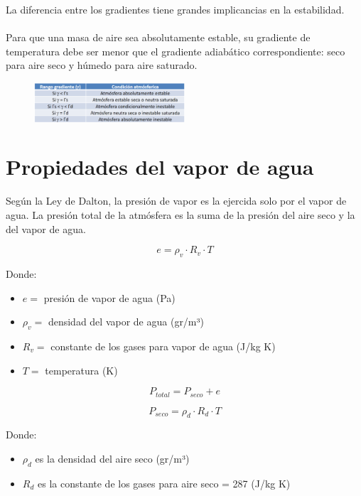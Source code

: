 La diferencia entre los gradientes tiene grandes implicancias en la estabilidad.
\\\\
Para que una masa de aire sea absolutamente estable, su gradiente de temperatura debe ser menor que el gradiente adiabático correspondiente: seco para aire seco y húmedo para aire saturado.

\begin{figure}[H]
    \centering
    \includegraphics[width=0.5\textwidth]{imagenes/estabilidad.png}
    \label{fig:estabilidad}
\end{figure}

\section{Propiedades del vapor de agua}

Según la Ley de Dalton, la presión de vapor es la ejercida solo por el vapor de agua. La presión total de la atmósfera es la suma de la presión del aire seco y la del vapor de agua.

\begin{equation}
    e = \rho_v \cdot R_v \cdot T
\end{equation}

Donde:
\begin{itemize}
    \item $e = $ presión de vapor de agua (Pa)
    \item $\rho_v = $ densidad del vapor de agua (gr/m³)
    \item $R_v = $ constante de los gases para vapor de agua (J/kg K)
    \item $T = $ temperatura (K)
\end{itemize}

\begin{equation}
    P_{total} = P_{seco} + e
\end{equation}

\begin{equation}
    P_{seco} = \rho_d \cdot R_d \cdot T
\end{equation}

Donde: 
\begin{itemize}
    \item $\rho_d$ es la densidad del aire seco (gr/m³)
    \item $R_d$ es la constante de los gases para aire seco = 287 (J/kg K)
\end{itemize}

